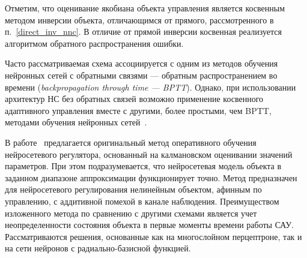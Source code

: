 Отметим, что оценивание якобиана объекта управления является косвенным
методом инверсии объекта, отличающимся от прямого, рассмотренного в
п.~\ref{direct_inv_nnc}.  В отличие от прямой инверсии косвенная
реализуется алгоритмом обратного распространения ошибки.


Часто рассматриваемая схема ассоциируется с одним из методов обучения
нейронных сетей с обратными связями --- обратным распространением во
времени ({\it backpropagation through time --- BPTT}).  Однако, при
использовании архитектур НС без обратных связей возможно применение
косвенного адаптивного управления вместе с другими, более простыми,
чем BPTT, методами обучения нейронных сетей~\cite{narpart92}.

В работе~\cite{fabri98} предлагается оригинальный метод оперативного
обучения нейросетевого регулятора, основанный на калмановском
оценивании значений параметров.  При этом подразумевается, что
нейросетевая модель объекта в заданном диапазоне аппроксимации
функционирует точно.  Метод предназначен для нейросетевого
регулирования нелинейным объектом, афинным по управлению, с аддитивной
помехой в канале наблюдения.  Преимуществом изложенного метода по
сравнению с другими схемами является учет неопределенности состояния
объекта в первые моменты времени работы САУ.  Рассматриваются решения,
основанные как на многослойном перцептроне, так и на сети нейронов с
радиально-базисной функцией.



